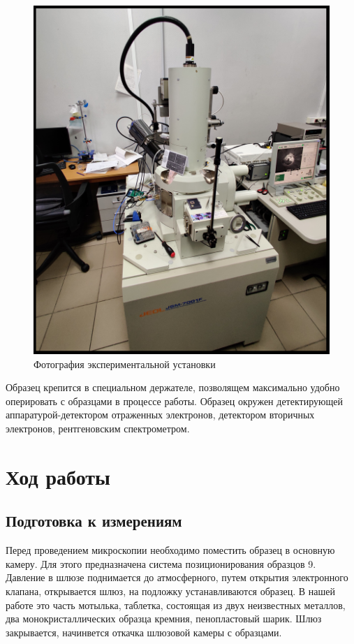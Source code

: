 \documentclass[a4paper,12pt]{article}
\theoremstyle{plain} %
\theoremstyle{definition} %
\theoremstyle{remark} %
\begin{document}
\begin{figure}[h!]
	\centering
	\includegraphics[scale=0.13]{pic2.jpg}
	\caption{Фотография экспериментальной установки}
	\label{pic2}
\end{figure}
Образец крепится в специальном держателе, позволящем максимально удобно оперировать с образцами в процессе работы. Образец окружен детектирующей аппаратурой-детектором отраженных электронов, детектором вторичных электронов, рентгеновским спектрометром. 
\section{Ход работы}
\subsection{Подготовка к измерениям}
Перед проведением микроскопии необходимо поместить образец в основную камеру. Для этого предназначена система позиционирования образцов 9. Давление в шлюзе поднимается до атмосферного, путем открытия электронного клапана, открывается шлюз, на подложку устанавливаются образец. В нашей работе это часть мотылька, таблетка, состоящая из двух неизвестных металлов, два монокристаллических образца кремния, пенопластовый шарик. Шлюз закрывается, начинвется откачка шлюзовой камеры с образцами. 
\end{document}
